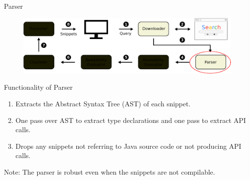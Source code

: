 \documentclass[compress]{beamer}
\begin{document}
\begin{frame}{Parser}
	\vspace{-8pt}
	\begin{figure}[t]
	\includegraphics[scale=0.3]{parser}
	\end{figure}
	
	\vspace{-8pt}
	\begin{block}{Functionality of Parser}
	\begin{enumerate}
		\item Extracts the Abstract Syntax Tree (AST) of each snippet.
		\item One pass over AST to extract type declarations and one pass to extract API calls.
		\item Drops any snippets not referring to Java source code or not producing API calls.
	\end{enumerate}
	\end{block}
		
	{\Medium Note}: The parser is robust even when the snippets are not compilable.
\end{frame}

\end{document}
